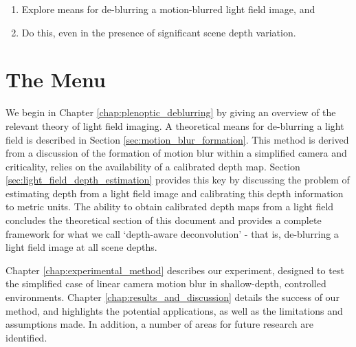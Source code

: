 \begin{enumerate}
\item Explore means for de-blurring a motion-blurred light field image, and
\item Do this, even in the presence of significant scene depth variation.
\end{enumerate}

\section{The Menu}
\label{sec:the_menu}

We begin in Chapter \ref{chap:plenoptic_deblurring} by giving an overview of the relevant theory of light field imaging.
A theoretical means for de-blurring a light field is described in Section \ref{sec:motion_blur_formation}.
This method is derived from a discussion of the formation of motion blur within a simplified camera and criticality, relies on the availability of a calibrated depth map.
Section \ref{sec:light_field_depth_estimation} provides this key by discussing the problem of estimating depth from a light field image and calibrating this depth information to metric units.
The ability to obtain calibrated depth maps from a light field concludes the theoretical section of this document and provides a complete framework for what we call \enquote*{depth-aware deconvolution} - that is, de-blurring a light field image at all scene depths.

Chapter \ref{chap:experimental_method} describes our experiment, designed to test the simplified case of linear camera motion blur in shallow-depth, controlled environments.
Chapter \ref{chap:results_and_discussion} details the success of our method, and highlights the potential applications, as well as the limitations and assumptions made.
In addition, a number of areas for future research are identified.
